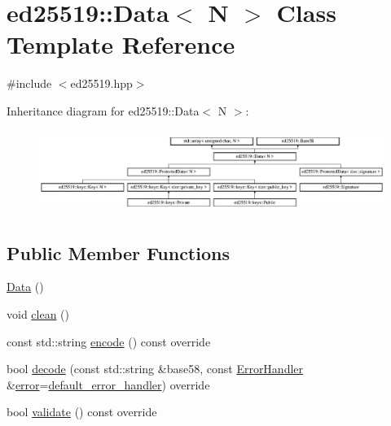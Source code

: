 \hypertarget{classed25519_1_1_data}{}\section{ed25519\+::Data$<$ N $>$ Class Template Reference}
\label{classed25519_1_1_data}


{\ttfamily \#include $<$ed25519.\+hpp$>$}

Inheritance diagram for ed25519\+::Data$<$ N $>$\+:\begin{figure}[H]
\begin{center}
\leavevmode
\includegraphics[height=2.702703cm]{classed25519_1_1_data}
\end{center}
\end{figure}
\subsection*{Public Member Functions}
\begin{DoxyCompactItemize}
\item 
\mbox{\hyperlink{classed25519_1_1_data_a2c637587095d6527cd4136926fb8b452}{Data}} ()
\item 
void \mbox{\hyperlink{classed25519_1_1_data_a65d5eba2b3c68f68001ef4d32645f9d9}{clean}} ()
\item 
const std\+::string \mbox{\hyperlink{classed25519_1_1_data_a2dc2e23b950a10b168d7509a63ffca53}{encode}} () const override
\item 
bool \mbox{\hyperlink{classed25519_1_1_data_a281d932d3c3fe7fd40ce86ea7eff559b}{decode}} (const std\+::string \&base58, const \mbox{\hyperlink{namespaceed25519_a6ba572942b3c18591fc869d52a6b16e6}{Error\+Handler}} \&\mbox{\hyperlink{namespaceed25519_ac93d0b5156eaca22197055e902920bc4}{error}}=\mbox{\hyperlink{namespaceed25519_a7c7bb6ed17541162959c33ed3e3b15fb}{default\+\_\+error\+\_\+handler}}) override
\item 
bool \mbox{\hyperlink{classed25519_1_1_data_ac365c9862b45379c677449b622c74da5}{validate}} () const override
\end{DoxyCompactItemize}
